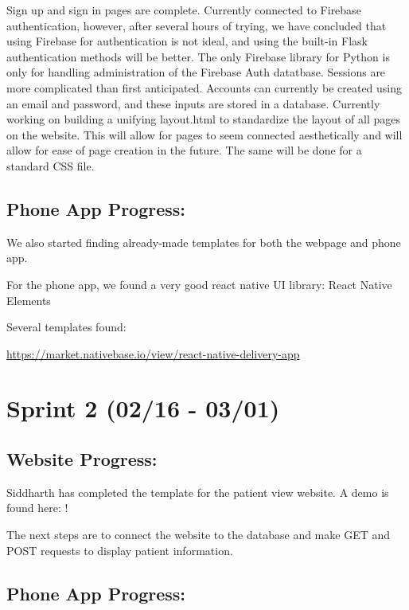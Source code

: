 \documentclass[]{book}
\begin{document}
Sign up and sign in pages are complete. Currently connected to Firebase authentication, however, after several hours of trying, we have concluded that using Firebase for authentication is not ideal, and using the built-in Flask authentication methods will be better. The only Firebase library for Python is only for handling administration of the Firebase Auth datatbase. Sessions are more complicated than first anticipated. Accounts can currently be created using an email and password, and these inputs are stored in a database. Currently working on building a unifying layout.html to standardize the layout of all pages on the website. This will allow for pages to seem connected aesthetically and will allow for ease of page creation in the future. The same will be done for a standard CSS file.

\hypertarget{phone-app-progress}{%
\subsection{Phone App Progress:}\label{phone-app-progress}}

We also started finding already-made templates for both the webpage and phone app.

For the phone app, we found a very good react native UI library: React Native Elements

Several templates found:

\url{https://market.nativebase.io/view/react-native-delivery-app}

\hypertarget{sprint-2-0216---0301}{%
\section{Sprint 2 (02/16 - 03/01)}\label{sprint-2-0216---0301}}

\hypertarget{website-progress-1}{%
\subsection{Website Progress:}\label{website-progress-1}}

Siddharth has completed the template for the patient view website. A demo is found here:
!

The next steps are to connect the website to the database and make GET and POST requests to display patient information.

\hypertarget{phone-app-progress-1}{%
\subsection{Phone App Progress:}\label{phone-app-progress-1}}
\end{document}
